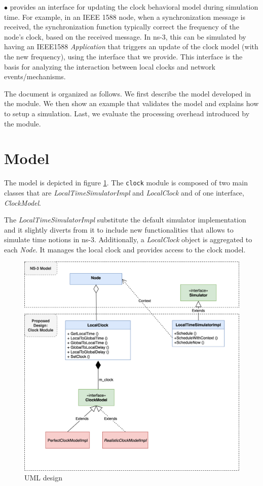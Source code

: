 \documentclass[times, twoside, watermark]{zHenriquesLab-StyleBioRxiv}
\begin{document}
$\bullet$ provides an interface for updating the clock behavioral model during simulation time. For example, in an IEEE 1588 node, when a synchronization message is received, the synchronization function typically correct the frequency of the node's clock, based on the received message. In ns-3, this can be simulated by having an IEEE1588 \textit{Application} that triggers an update of the clock model (with the new frequency), using the interface that we provide. This interface is the basis for analyzing the interaction between local clocks and network events/mechanisms.

The document is organized as follows. We first describe the model developed in the module. We then show an example that validates the model and explains how to setup a simulation. Last, we evaluate the processing overhead introduced by the module.


\section*{Model}
The model is depicted in figure \ref{fig:UMLDesign}. 
The \texttt{clock} module is composed of two main classes that are \textit{LocalTimeSimulatorImpl} and \textit{LocalClock} and of one interface, \textit{ClockModel}.

The %
\textit{LocalTimeSimulatorImpl} substitute the default simulator implementation and it slightly diverts from it to include new functionalities that allows to simulate time notions in ns-3.
Additionally, a \textit{LocalClock} object is aggregated to each \textit{Node}. It manages the local clock and provides access to the clock model.

\begin{figure}%
\centering
\includegraphics[width=.8\linewidth]{Figures/UMLSimulator.png}
\caption{UML design}
\label{fig:UMLDesign}
\end{figure}
\end{document}
